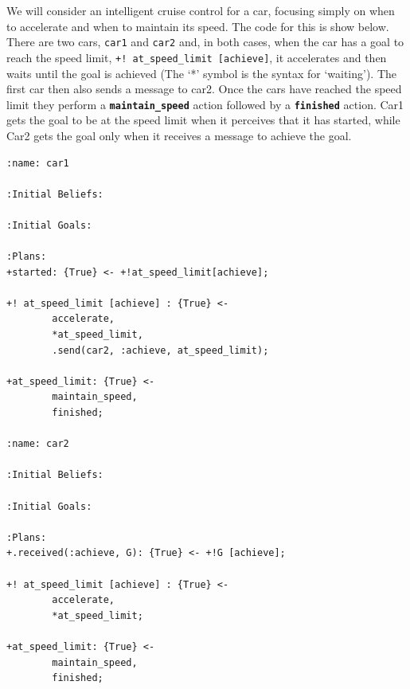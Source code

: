 \begin{ourexample}
\label{ex:cruise}
We will consider an intelligent cruise control for a car, focusing simply
on when to accelerate and when to maintain its speed.
The \gwendolen{} code for this is show below.  There are two
cars, \lstinline{car1} and \lstinline{car2} and, in both cases, when
the car has a goal to reach the speed limit,
\lstinline{+! at_speed_limit [achieve]}, it accelerates and then
waits until the goal is achieved (The `*' symbol is the \gwendolen{}
syntax for `waiting').  The first car then also sends a message to
car2.  Once the cars have reached the speed limit they perform a
\textbf{\lstinline{maintain_speed}} action followed by a 
\textbf{\lstinline{finished}} action.  Car1 gets the goal to be at 
the speed limit when it perceives that it has started, while Car2 gets
the goal only when it receives a message to achieve the goal.

\begin{lstlisting}[basicstyle=\footnotesize\sffamily,language=Gwendolen,style=easslisting]
:name: car1
                        
:Initial Beliefs:
                                                                                                        
:Initial Goals:
                
:Plans: 
+started: {True} <- +!at_speed_limit[achieve];

+! at_speed_limit [achieve] : {True} <-
        accelerate,
        *at_speed_limit,
        .send(car2, :achieve, at_speed_limit);

+at_speed_limit: {True} <-
        maintain_speed,
        finished;

:name: car2
                        
:Initial Beliefs:
                                                                                                        
:Initial Goals:
                
:Plans: 
+.received(:achieve, G): {True} <- +!G [achieve];

+! at_speed_limit [achieve] : {True} <-
        accelerate,
        *at_speed_limit;

+at_speed_limit: {True} <-
        maintain_speed,
        finished;
\end{lstlisting} 
\label{ex:cars}
\end{ourexample}

